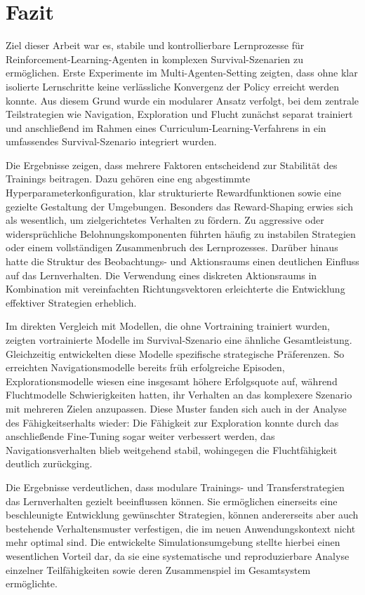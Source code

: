 \chapter{Fazit}
\label{chap:fazit}

Ziel dieser Arbeit war es, stabile und kontrollierbare Lernprozesse für Reinforcement-Learning-Agenten in komplexen Survival-Szenarien zu ermöglichen. Erste Experimente im Multi-Agenten-Setting zeigten, dass ohne klar isolierte Lernschritte keine verlässliche Konvergenz der Policy erreicht werden konnte. Aus diesem Grund wurde ein modularer Ansatz verfolgt, bei dem zentrale Teilstrategien wie Navigation, Exploration und Flucht zunächst separat trainiert und anschließend im Rahmen eines Curriculum-Learning-Verfahrens in ein umfassendes Survival-Szenario integriert wurden.

Die Ergebnisse zeigen, dass mehrere Faktoren entscheidend zur Stabilität des Trainings beitragen. Dazu gehören eine eng abgestimmte Hyperparameterkonfiguration, klar strukturierte Rewardfunktionen sowie eine gezielte Gestaltung der Umgebungen. Besonders das Reward-Shaping erwies sich als wesentlich, um zielgerichtetes Verhalten zu fördern. Zu aggressive oder widersprüchliche Belohnungskomponenten führten häufig zu instabilen Strategien oder einem vollständigen Zusammenbruch des Lernprozesses. Darüber hinaus hatte die Struktur des Beobachtungs- und Aktionsraums einen deutlichen Einfluss auf das Lernverhalten. Die Verwendung eines diskreten Aktionsraums in Kombination mit vereinfachten Richtungsvektoren erleichterte die Entwicklung effektiver Strategien erheblich.

Im direkten Vergleich mit Modellen, die ohne Vortraining trainiert wurden, zeigten vortrainierte Modelle im Survival-Szenario eine ähnliche Gesamtleistung. Gleichzeitig entwickelten diese Modelle spezifische strategische Präferenzen. So erreichten Navigationsmodelle bereits früh erfolgreiche Episoden, Explorationsmodelle wiesen eine insgesamt höhere Erfolgsquote auf, während Fluchtmodelle Schwierigkeiten hatten, ihr Verhalten an das komplexere Szenario mit mehreren Zielen anzupassen. Diese Muster fanden sich auch in der Analyse des Fähigkeitserhalts wieder: Die Fähigkeit zur Exploration konnte durch das anschließende Fine-Tuning sogar weiter verbessert werden, das Navigationsverhalten blieb weitgehend stabil, wohingegen die Fluchtfähigkeit deutlich zurückging.

Die Ergebnisse verdeutlichen, dass modulare Trainings- und Transferstrategien das Lernverhalten gezielt beeinflussen können. Sie ermöglichen einerseits eine beschleunigte Entwicklung gewünschter Strategien, können andererseits aber auch bestehende Verhaltensmuster verfestigen, die im neuen Anwendungskontext nicht mehr optimal sind. Die entwickelte Simulationsumgebung stellte hierbei einen wesentlichen Vorteil dar, da sie eine systematische und reproduzierbare Analyse einzelner Teilfähigkeiten sowie deren Zusammenspiel im Gesamtsystem ermöglichte.

